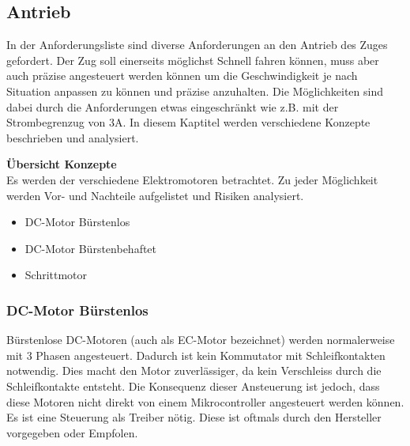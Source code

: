 \documentclass[../../main.tex]{subfiles}
\begin{document}
    \subsection{Antrieb}
    In der Anforderungsliste sind diverse Anforderungen an den Antrieb des Zuges gefordert.
    Der Zug soll einerseits möglichst Schnell fahren können, muss aber auch präzise angesteuert werden können um die Geschwindigkeit je nach Situation anpassen zu können und präzise anzuhalten.
    Die Möglichkeiten sind dabei durch die Anforderungen etwas eingeschränkt wie z.B. mit der Strombegrenzug von 3A.
    In diesem Kaptitel werden verschiedene Konzepte beschrieben und analysiert.

    \textbf{Übersicht Konzepte}\\
    Es werden der verschiedene Elektromotoren betrachtet. Zu jeder Möglichkeit werden Vor- und Nachteile aufgelistet und Risiken analysiert.

    \begin{itemize}
        \item DC-Motor Bürstenlos
        \item DC-Motor Bürstenbehaftet
        \item Schrittmotor
    \end{itemize}

    \subsubsection{DC-Motor Bürstenlos}

    Bürstenlose DC-Motoren (auch als EC-Motor bezeichnet) werden normalerweise mit 3 Phasen angesteuert. Dadurch ist kein Kommutator mit Schleifkontakten notwendig. Dies macht den Motor zuverlässiger, da kein Verschleiss durch die Schleifkontakte entsteht.
    Die Konsequenz dieser Ansteuerung ist jedoch, dass diese Motoren nicht direkt von einem Mikrocontroller angesteuert werden können. Es ist eine Steuerung als Treiber nötig. Diese ist oftmals durch den Hersteller vorgegeben oder Empfolen.
\end{document}
